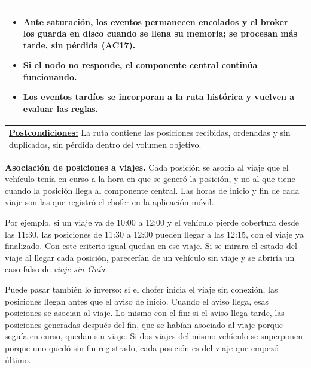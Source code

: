 \begin{table}[H]
\begin{tabular}{|p{15.8cm}|}
\begin{itemize}[leftmargin=*,topsep=2pt,itemsep=1pt,parsep=0pt,partopsep=0pt]
    \item Ante saturación, los eventos permanecen encolados y el broker los guarda en disco cuando se llena su memoria; se procesan más tarde, sin pérdida (AC17).
    \item Si el nodo no responde, el componente central continúa funcionando.
    \item Los eventos tardíos se incorporan a la ruta histórica y vuelven a evaluar las reglas.
\end{itemize} \\ \hline
\textbf{\underline{Postcondiciones:}} La ruta contiene las posiciones recibidas, ordenadas y sin duplicados, sin pérdida dentro del volumen objetivo. \\ \hline
\end{tabular}
\end{table}

\textbf{Asociación de posiciones a viajes.} Cada posición se asocia al viaje que el vehículo tenía en curso a la hora en que se generó la posición, y no al que tiene cuando la posición llega al componente central. Las horas de inicio y fin de cada viaje son las que registró el chofer en la aplicación móvil.

Por ejemplo, si un viaje va de 10:00 a 12:00 y el vehículo pierde cobertura desde las 11:30, las posiciones de 11:30 a 12:00 pueden llegar a las 12:15, con el viaje ya finalizado. Con este criterio igual quedan en ese viaje. Si se mirara el estado del viaje al llegar cada posición, parecerían de un vehículo sin viaje y se abriría un caso falso de \emph{viaje sin Guía}.

Puede pasar también lo inverso: si el chofer inicia el viaje sin conexión, las posiciones llegan antes que el aviso de inicio. Cuando el aviso llega, esas posiciones se asocian al viaje. Lo mismo con el fin: si el aviso llega tarde, las posiciones generadas después del fin, que se habían asociado al viaje porque seguía en curso, quedan sin viaje. Si dos viajes del mismo vehículo se superponen porque uno quedó sin fin registrado, cada posición es del viaje que empezó último.

